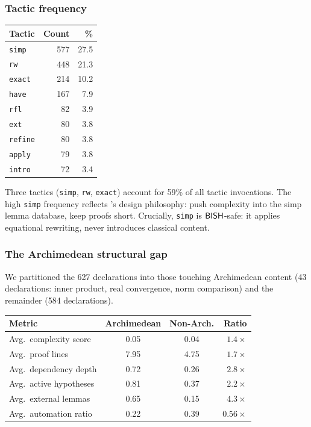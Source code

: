 \subsubsection{Tactic frequency}\label{sec:tactic-freq}

\begin{center}
\small
\begin{tabular}{lrr}
\toprule
\textbf{Tactic} & \textbf{Count} & \textbf{\%} \\
\midrule
\texttt{simp}     & 577 & 27.5 \\
\texttt{rw}       & 448 & 21.3 \\
\texttt{exact}    & 214 & 10.2 \\
\texttt{have}     & 167 &  7.9 \\
\texttt{rfl}      &  82 &  3.9 \\
\texttt{ext}      &  80 &  3.8 \\
\texttt{refine}   &  80 &  3.8 \\
\texttt{apply}    &  79 &  3.8 \\
\texttt{intro}    &  72 &  3.4 \\
\bottomrule
\end{tabular}
\end{center}

Three tactics (\texttt{simp}, \texttt{rw}, \texttt{exact}) account for
59\% of all tactic invocations.  The high \texttt{simp} frequency
reflects \Mathlib's design philosophy: push complexity into the simp
lemma database, keep proofs short.  Crucially, \texttt{simp} is
$\textsf{BISH}$-safe: it applies equational rewriting, never introduces
classical content.

\subsubsection{The Archimedean structural gap}\label{sec:arch-gap}

We partitioned the 627 declarations into those touching Archimedean
content (43 declarations: inner product, real convergence, norm
comparison) and the remainder (584 declarations).

\begin{center}
\begin{tabular}{lccr}
\toprule
\textbf{Metric} & \textbf{Archimedean} & \textbf{Non-Arch.} & \textbf{Ratio} \\
\midrule
Avg.\ complexity score  & 0.05  & 0.04  & $1.4\times$ \\
Avg.\ proof lines       & 7.95  & 4.75  & $1.7\times$ \\
Avg.\ dependency depth  & 0.72  & 0.26  & $2.8\times$ \\
Avg.\ active hypotheses & 0.81  & 0.37  & $2.2\times$ \\
Avg.\ external lemmas   & 0.65  & 0.15  & $4.3\times$ \\
Avg.\ automation ratio  & 0.22  & 0.39  & $0.56\times$ \\
\bottomrule
\end{tabular}
\end{center}

